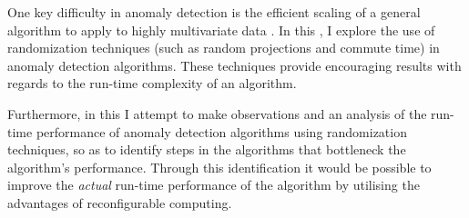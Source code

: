 One key difficulty in anomaly detection is the efficient scaling of a general
algorithm to apply to highly multivariate data \citeNeeded{}. In this \thesis{},
I explore the use of randomization techniques (such as random projections and
commute time) in anomaly detection algorithms. These techniques provide
encouraging results with regards to the run-time complexity of an algorithm.

Furthermore, in this \thesis{} I attempt to make observations and an analysis of
the run-time performance of anomaly detection algorithms using randomization
techniques, so as to identify steps in the algorithms that bottleneck the
algorithm's performance. Through this identification it would be possible to
improve the \emph{actual} run-time performance of the algorithm by utilising the
advantages of reconfigurable computing.